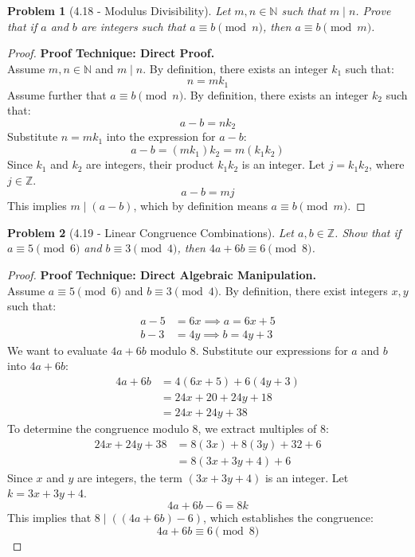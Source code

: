 \documentclass[11pt]{article}
\newtheorem{problem}{Problem}
\begin{document}
\begin{problem}[4.18 - Modulus Divisibility]
Let $m, n \in \mathbb{N}$ such that $m \mid n$. Prove that if $a$ and $b$ are integers such that $a \equiv b \pmod n$, then $a \equiv b \pmod m$.
\end{problem}
\begin{proof}
\textbf{Proof Technique: Direct Proof.} \\
Assume $m, n \in \mathbb{N}$ and $m \mid n$. By definition, there exists an integer $k_1$ such that:
\[ n = mk_1 \]
Assume further that $a \equiv b \pmod n$. By definition, there exists an integer $k_2$ such that:
\[ a - b = nk_2 \]
Substitute $n = mk_1$ into the expression for $a - b$:
\[ a - b = (mk_1)k_2 = m(k_1 k_2) \]
Since $k_1$ and $k_2$ are integers, their product $k_1 k_2$ is an integer. Let $j = k_1 k_2$, where $j \in \mathbb{Z}$.
\[ a - b = mj \]
This implies $m \mid (a - b)$, which by definition means $a \equiv b \pmod m$.
\end{proof}

\begin{problem}[4.19 - Linear Congruence Combinations]
Let $a, b \in \mathbb{Z}$. Show that if $a \equiv 5 \pmod 6$ and $b \equiv 3 \pmod 4$, then $4a + 6b \equiv 6 \pmod 8$.
\end{problem}
\begin{proof}
\textbf{Proof Technique: Direct Algebraic Manipulation.} \\
Assume $a \equiv 5 \pmod 6$ and $b \equiv 3 \pmod 4$. By definition, there exist integers $x, y$ such that:
\begin{align}
    a - 5 &= 6x \implies a = 6x + 5 \\
    b - 3 &= 4y \implies b = 4y + 3 
\end{align}
We want to evaluate $4a + 6b$ modulo 8. Substitute our expressions for $a$ and $b$ into $4a + 6b$:
\begin{align*}
    4a + 6b &= 4(6x + 5) + 6(4y + 3) \\
            &= 24x + 20 + 24y + 18 \\
            &= 24x + 24y + 38
\end{align*}
To determine the congruence modulo 8, we extract multiples of 8:
\begin{align*}
    24x + 24y + 38 &= 8(3x) + 8(3y) + 32 + 6 \\
                   &= 8(3x + 3y + 4) + 6
\end{align*}
Since $x$ and $y$ are integers, the term $(3x + 3y + 4)$ is an integer. Let $k = 3x + 3y + 4$.
\[ 4a + 6b - 6 = 8k \]
This implies that $8 \mid ((4a + 6b) - 6)$, which establishes the congruence:
\[ 4a + 6b \equiv 6 \pmod 8 \]
\end{proof}
\end{document}
